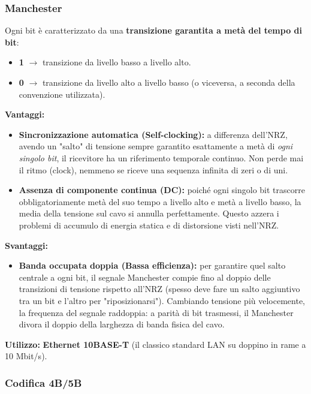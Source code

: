 \documentclass[a4paper,12pt]{report}
\begin{document}
\subsubsection{Manchester}

Ogni bit è caratterizzato da una \textbf{transizione garantita a metà del tempo di bit}:
\begin{itemize}
    \item \textbf{1} $\rightarrow$ transizione da livello basso a livello alto.
    \item \textbf{0} $\rightarrow$ transizione da livello alto a livello basso (o viceversa, a seconda della convenzione utilizzata).
\end{itemize}

\textbf{Vantaggi:}
\begin{itemize}
    \item \textbf{Sincronizzazione automatica (Self-clocking):} a differenza dell'NRZ, avendo un "salto" di tensione sempre garantito esattamente a metà di \textit{ogni singolo bit}, il ricevitore ha un riferimento temporale continuo. Non perde mai il ritmo (clock), nemmeno se riceve una sequenza infinita di zeri o di uni.
    \item \textbf{Assenza di componente continua (DC):} poiché ogni singolo bit trascorre obbligatoriamente metà del suo tempo a livello alto e metà a livello basso, la media della tensione sul cavo si annulla perfettamente. Questo azzera i problemi di accumulo di energia statica e di distorsione visti nell'NRZ.
\end{itemize}

\textbf{Svantaggi:}
\begin{itemize}
    \item \textbf{Banda occupata doppia (Bassa efficienza):} per garantire quel salto centrale a ogni bit, il segnale Manchester compie fino al doppio delle transizioni di tensione rispetto all'NRZ (spesso deve fare un salto aggiuntivo tra un bit e l'altro per "riposizionarsi"). Cambiando tensione più velocemente, la frequenza del segnale raddoppia: a parità di bit trasmessi, il Manchester divora il doppio della larghezza di banda fisica del cavo.
\end{itemize}

\textbf{Utilizzo:} \textbf{Ethernet 10BASE-T} (il classico standard LAN su doppino in rame a 10 Mbit/s).
\subsubsection{Codifica 4B/5B}
\end{document}
